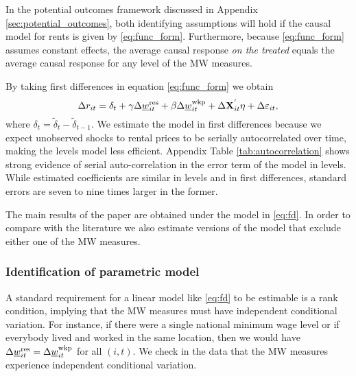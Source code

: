 In the potential outcomes framework discussed in Appendix 
\ref{sec:potential_outcomes}, both identifying assumptions will hold if
the causal model for rents is given by \eqref{eq:func_form}.
Furthermore, because \eqref{eq:func_form} assumes constant effects, the 
average causal response \textit{on the treated} equals the average causal 
response for any level of the MW measures.

By taking first differences in equation \eqref{eq:func_form} we obtain
\begin{equation}\label{eq:fd}
    \Delta r_{it} = \delta_t
                  + \gamma \Delta \underline{w}^{\text{res}}_{it} + \beta \Delta \underline{w}^{\text{wkp}}_{it}
                  + \Delta \mathbf{X}^{'}_{it}\eta
                  + \Delta \varepsilon_{it} ,
\end{equation}
where $\delta_t = \tilde{\delta}_t - \tilde{\delta}_{t-1}$.
We estimate the model in first differences because we expect unobserved shocks
to rental prices to be serially autocorrelated over time, making the levels
model less efficient.
Appendix Table \ref{tab:autocorrelation} shows strong evidence of serial 
auto-correlation in the error term of the model in levels.
While estimated coefficients are similar in levels and in first differences, 
standard errors are seven to nine times larger in the former.

The main results of the paper are obtained under the model in \eqref{eq:fd}. 
In order to compare with the literature we also estimate versions of the 
model that exclude either one of the MW measures.

\subsubsection*{Identification of parametric model}

A standard requirement for a linear model like \eqref{eq:fd} to be
estimable is a rank condition, implying that the MW measures must have 
independent conditional variation.
For instance, if there were a single national minimum wage level or if everybody 
lived and worked in the same location, then we would have
$\Delta \underline{w}^{\text{res}}_{it} = \Delta \underline{w}^{\text{wkp}}_{it}$ for all $(i,t)$.
We check in the data that the MW measures experience independent conditional 
variation.

